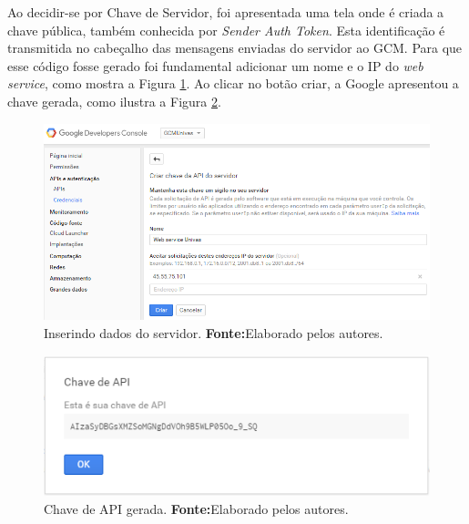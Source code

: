 	\par Ao decidir-se por Chave de Servidor, foi apresentada uma tela onde é
criada a chave pública, também conhecida por \textit{Sender Auth Token}. Esta
identificação é transmitida no cabeçalho das mensagens enviadas do servidor ao
GCM. Para que esse código fosse gerado foi fundamental adicionar um nome e o IP
do \textit{web service}, como mostra a Figura \ref{fig:gcm8}. Ao clicar no
botão criar, a Google apresentou a chave gerada, como ilustra a Figura
\ref{fig:gcm9}.

	\begin{figure}[h!] 
		\centerline{\includegraphics[scale=0.55]{./imagens/2_q_metodologico/4_procedimentos_resultados/41_gcm/gcm8.png}}
		\caption[Inserindo dados do servidor]{Inserindo dados do servidor.
		\textbf{Fonte:}Elaborado pelos autores.}
		\label{fig:gcm8}
	\end{figure}
	
	\begin{figure}[h!] 
		\centerline{\includegraphics[scale=0.7]{./imagens/2_q_metodologico/4_procedimentos_resultados/41_gcm/gcm9.png}}
		\caption[Chave de API gerada]{Chave de API gerada.
		\textbf{Fonte:}Elaborado pelos autores.}
		\label{fig:gcm9}
	\end{figure}

